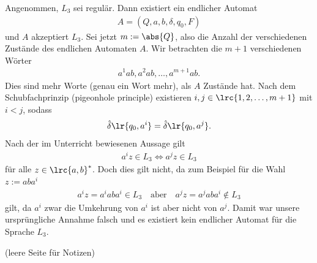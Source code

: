 \begin{questions}
\begin{parts}
		\begin{solution}
			Angenommen, $L_3$ sei regulär. Dann existiert ein endlicher Automat
			\begin{align*}
				A = (Q, {a,b}, \delta, q_0, F)
			\end{align*}
			und $A$ akzeptiert $L_3$. Sei jetzt $m := \abs{Q}$, also die Anzahl der verschiedenen Zustände des endlichen Automaten
			$A$. Wir betrachten die $m+1$ verschiedenen Wörter
			\begin{align*}
				a^1ab, a^2ab, \ldots, a^{m+1}ab.
			\end{align*}
			Dies sind mehr Worte (genau ein Wort mehr), als $A$ Zustände hat. Nach dem Schubfachprinzip (pigeonhole principle) existieren
			$i,j\in\lrc{1,2,\ldots,m+1}$ mit $i<j$, sodass
			\begin{align*}
				\hat{\delta}\lr{q_0,a^i} = \hat{\delta}\lr{q_0,a^j}.
			\end{align*}
			Nach der im Unterricht bewiesenen Aussage gilt
			\begin{align*}
				a^iz\in L_3 \iff a^jz\in L_3
			\end{align*}
			für alle $z\in\lrc{a,b}^*$. Doch dies gilt nicht, da zum Beispiel für die Wahl $z:=aba^i$
			\begin{align*}
				a^iz = a^iaba^i\in L_3 \quad\text{aber}\quad a^jz = a^jaba^i\notin L_3
			\end{align*}
			gilt, da $a^i$ zwar die Umkehrung von $a^i$ ist aber nicht von $a^j$. Damit war unsere ursprüngliche Annahme falsch und es existiert kein
			endlicher Automat für die Sprache $L_3$.
		\end{solution}
	\end{parts}
	\droptotalpoints
\end{questions}

\clearpage
(leere Seite für Notizen)
